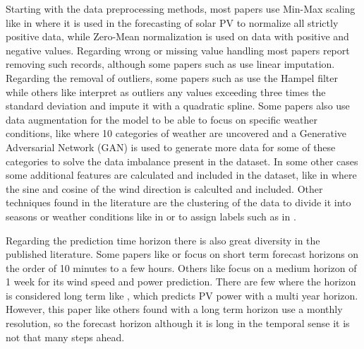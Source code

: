 Starting with the data preprocessing methods, most papers use Min-Max scaling like in \cite{ju_sun_chen_zhang_zhu_rehman_2019} where it is used in the forecasting of solar PV to normalize all strictly positive data, while Zero-Mean normalization is used on data with positive and negative values. Regarding wrong or missing value handling most papers report removing such records, although some papers such as \cite{peng_peng_fu_lu_tang_wang_li_2020} use linear imputation. Regarding the removal of outliers, some papers such as \cite{sharadga_hajimirza_balog_2020} use the Hampel filter while others like \cite{zang_cheng_ding_cheung_wang_wei_sun_2020} interpret as outliers any values exceeding three times the standard deviation and impute it with a quadratic spline.  
Some papers also use data augmentation for the model to be able to focus on specific weather conditions, like \cite{wang_zhang_liu_yu_pang_nevenshafie2018} where 10 categories of weather are uncovered and a Generative Adversarial Network (GAN) is used to generate more data for some of these categories to solve the data imbalance present in the dataset. In some other cases some additional features are calculated and included in the dataset, like in \cite{yin_ou_huang_meng_2019} where the sine and cosine of the wind direction is calculted and included.
Other techniques found in the literature are the clustering of the data to divide it into seasons or weather conditions like in \cite{alzahrani_shamsi_cihan_ferdowsi_2017} or to assign labels such as in \cite{wang_xuan_zhen_li_wang_shi_2020}.

Regarding the prediction time horizon there is also great diversity in the published literature. Some papers like \cite {hu_zhang_zhou_2015} or \cite{chen_zhu_li_zhu_shi_li_duan_liu_2019} focus on short term forecast horizons on the order of 10 minutes to a few hours.  Others like \cite{aly_2020} focus on a medium horizon of 1 week for its wind speed and power prediction. There are few where the horizon is considered long term like \cite{ray_shah_islam_islam_2020}, which predicts PV power with a multi year horizon. However, this paper like others found with a long term horizon use a monthly resolution, so the forecast horizon although it is long in the temporal sense it is not that many steps ahead. 

